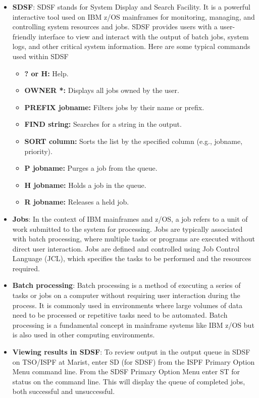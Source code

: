\documentclass{report}
\begin{document}
\begin{itemize}
        \item \textbf{SDSF}: SDSF stands for System Display and Search Facility. It is a powerful interactive tool used on IBM z/OS mainframes for monitoring, managing, and controlling system resources and jobs. SDSF provides users with a user-friendly interface to view and interact with the output of batch jobs, system logs, and other critical system information.
            \bigbreak \noindent 
            Here are some typical commands used within SDSF
            \begin{itemize}
            \item \textbf{? or H:} Help.
            \item \textbf{OWNER *:} Displays all jobs owned by the user.
            \item \textbf{PREFIX jobname:} Filters jobs by their name or prefix.
            \item \textbf{FIND string:} Searches for a string in the output.
            \item \textbf{SORT column:} Sorts the list by the specified column (e.g., jobname, priority).
            \item \textbf{P jobname:} Purges a job from the queue.
            \item \textbf{H jobname:} Holds a job in the queue.
            \item \textbf{R jobname:} Releases a held job.
            \end{itemize}
        \item \textbf{Jobs}: In the context of IBM mainframes and z/OS, a job refers to a unit of work submitted to the system for processing. Jobs are typically associated with batch processing, where multiple tasks or programs are executed without direct user interaction. Jobs are defined and controlled using Job Control Language (JCL), which specifies the tasks to be performed and the resources required.
        \item \textbf{Batch processing}: Batch processing is a method of executing a series of tasks or jobs on a computer without requiring user interaction during the process. It is commonly used in environments where large volumes of data need to be processed or repetitive tasks need to be automated. Batch processing is a fundamental concept in mainframe systems like IBM z/OS but is also used in other computing environments.
        \item \textbf{Viewing results in SDSF}: To review output in the output queue in SDSF on TSO/ISPF at Marist, enter SD (for SDSF) from the ISPF Primary Option Menu command line. From the SDSF Primary Option Menu enter ST for status on the command line. This will display the queue of completed jobs, both successful and unsuccessful. 

\end{itemize}
\end{document}
